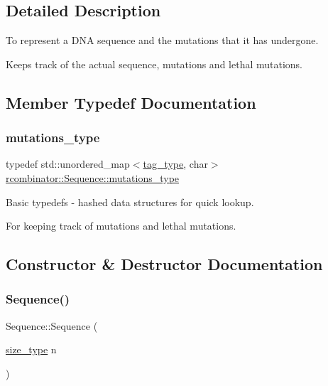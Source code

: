 \subsection{Detailed Description}
To represent a D\+NA sequence and the mutations that it has undergone. 

Keeps track of the actual sequence, mutations and lethal mutations. 

\subsection{Member Typedef Documentation}
\mbox{\label{classrcombinator_1_1Sequence_a4adff5141a0bf95a89b350ef5008000d}} 
\subsubsection{\texorpdfstring{mutations\+\_\+type}{mutations\_type}}
{\footnotesize\ttfamily typedef std\+::unordered\+\_\+map$<$\mbox{\hyperlink{constants_8h_a3e6daf1646e952257330d8cfe20e96f8}{tag\+\_\+type}}, char$>$ \mbox{\hyperlink{classrcombinator_1_1Sequence_a4adff5141a0bf95a89b350ef5008000d}{rcombinator\+::\+Sequence\+::mutations\+\_\+type}}\hspace{0.3cm}{\ttfamily [private]}}



Basic typedefs -\/ hashed data structures for quick lookup. 

For keeping track of mutations and lethal mutations. 

\subsection{Constructor \& Destructor Documentation}
\mbox{\label{classrcombinator_1_1Sequence_a04d0d6977316f2ab30844e584c4531ec}} 
\subsubsection{\texorpdfstring{Sequence()}{Sequence()}\hspace{0.1cm}{\footnotesize\ttfamily [1/3]}}
{\footnotesize\ttfamily Sequence\+::\+Sequence (\begin{DoxyParamCaption}\item[{\mbox{\hyperlink{constants_8h_abcd18a5521fc90ff6e7b00e4fee98397}{size\+\_\+type}}}]{n }\end{DoxyParamCaption})}



